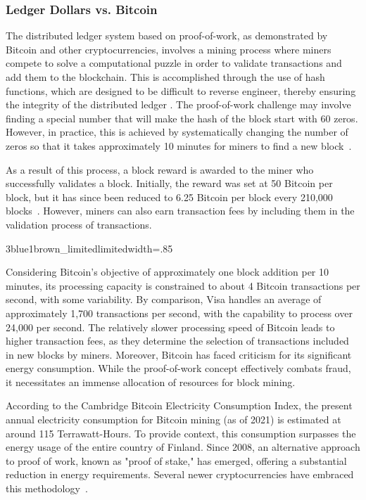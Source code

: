 \subsubsection{Ledger Dollars vs. Bitcoin}
The distributed ledger system based on proof-of-work, as demonstrated by Bitcoin and other cryptocurrencies, involves a mining process where
miners compete to solve a computational puzzle in order to validate transactions and add them to the blockchain. This is accomplished through
the use of hash functions, which are designed to be difficult to reverse engineer, thereby ensuring the integrity of the distributed ledger
\cite{bashir2017mastering}. The proof-of-work challenge may involve finding a special number that will make the hash of the block start with
60 zeros. However, in practice, this is achieved by systematically changing the number of zeros so that it takes approximately 10 minutes
for miners to find a new block~\cite{nakamoto2008bitcoin}.

As a result of this process, a block reward is awarded to the miner who successfully validates a block. Initially, the reward was set at
50 Bitcoin per block, but it has since been reduced to 6.25 Bitcoin per block every 210,000 blocks~\cite{nakamoto2008bitcoin}. However,
miners can also earn transaction fees by including them in the validation process of transactions.

{3blue1brown_limited}{limited}{width=.85\textwidth}%

Considering Bitcoin's objective of approximately one block addition per 10 minutes, its processing capacity is constrained to about 4 Bitcoin
transactions per second, with some variability. By comparison, Visa handles an average of approximately 1,700 transactions per second, with
the capability to process over 24,000 per second. The relatively slower processing speed of Bitcoin leads to higher transaction fees, as
they determine the selection of transactions included in new blocks by miners. Moreover, Bitcoin has faced criticism for its significant
energy consumption. While the proof-of-work concept effectively combats fraud, it necessitates an immense allocation of resources for block
mining.

According to the Cambridge Bitcoin Electricity Consumption Index, the present annual electricity consumption for Bitcoin mining (as of 2021)
is estimated at around 115 Terrawatt-Hours. To provide context, this consumption surpasses the energy usage of the entire country of Finland.
Since 2008, an alternative approach to proof of work, known as "proof of stake," has emerged, offering a substantial reduction in energy
requirements. Several newer cryptocurrencies have embraced this methodology~\cite{CBECS2021}.
